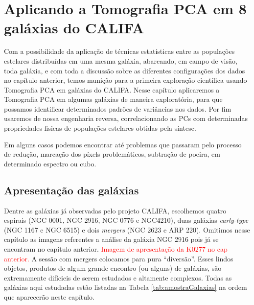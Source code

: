 


\chapter{Aplicando a Tomografia PCA em 8 galáxias do CALIFA}
\label{sec:result}

Com a possibilidade da aplicação de técnicas estatísticas entre as populações estelares distribuídas em uma mesma
galáxia, abarcando, em campo de visão, toda galáxia, e com toda a discussão sobre as diferentes configurações dos dados
no capítulo anterior, temos munição para a primeira exploração científica usando Tomografia PCA em galáxias do CALIFA.
Nesse capítulo aplicaremos a Tomografia PCA em algumas galáxias de maneira exploratória, para que possamos identificar
determinados padrões de variâncias nos dados. Por fim usaremos de nossa engenharia reversa, correlacionando as PCs com
determinadas propriedades fisicas de populações estelares obtidas pela síntese.

\ojo Em alguns casos podemos encontrar até problemas que passaram pelo processo de redução, marcação dos píxels
problemáticos, subtração de poeira, em determinado espectro ou cubo.

\section{Apresentação das galáxias}
\label{sec:result:apres}

Dentre as galáxias já observadas pelo projeto CALIFA, escolhemos quatro espirais (NGC 0001, NGC 2916, NGC 0776 e
NGC4210), duas galáxias {\em early-type} (NGC 1167 e NGC 6515) e dois {\em mergers} (NGC 2623 e ARP 220). Omitimos nesse
capítulo as imagens referentes a análise da galáxia NGC 2916 pois já se encontram no capitulo anterior. \fixme
\textcolor{red}{Imagem de apresentação da K0277 no cap anterior.} A sessão com mergers colocamos para pura ``diversão''.
Esses lindos objetos, produtos de algum grande encontro (ou alguns) de galáxias, são extremamente difícieis de serem
estudados e altamente complexos. Todas as galáxias aqui estudadas estão listadas na Tabela \ref{tab:amostraGalaxias} na
ordem que aparecerão neste capítulo.

